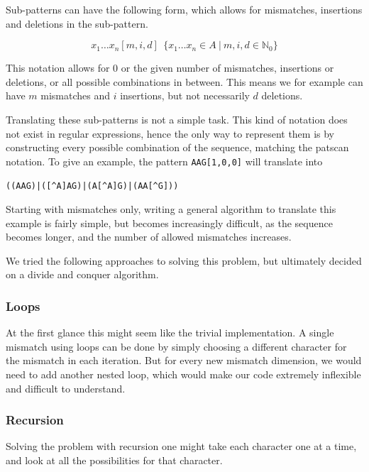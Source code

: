 \documentclass[12pt]{article}
\begin{document}
Sub-patterns can have the following form, which allows for mismatches, insertions and deletions in the sub-pattern. 

\begin{equation}
	x_1 \ldots x_n[m, i, d] \ \ \{ x_1 \ldots x_n \in A \ | \ m, i, d \in \mathbb{N}_0 \}
\end{equation} 

This notation allows for 0 or the given number of mismatches, insertions or deletions, or all possible combinations in between. This means we for example can have $m$ mismatches and $i$ insertions, but not necessarily $d$ deletions.

Translating these sub-patterns is not a simple task. This kind of notation does not exist in regular expressions, hence the only way to represent them is by constructing every possible combination of the sequence, matching the patscan notation. To give an example, the pattern \texttt{AAG[1,0,0]} will translate into 

\hspace*{\fill}
\texttt{((AAG)|([\^{}A]AG)|(A[\^{}A]G)|(AA[\^{}G]))}
\hspace*{\fill}

Starting with mismatches only, writing a general algorithm to translate this example is fairly simple, but becomes increasingly difficult, as the sequence becomes longer, and the number of allowed mismatches increases.

We tried the following approaches to solving this problem, but ultimately decided on a divide and conquer algorithm. 

\subsubsection{Loops}

At the first glance this might seem like the trivial implementation. A single mismatch using loops can be done by simply choosing a different character for the mismatch in each iteration.
But for every new mismatch dimension, we would need to add another nested loop, which would make our code extremely inflexible and difficult to understand.

\subsubsection{Recursion}

Solving the problem with recursion one might take each character one at a time, and look at all the possibilities for that character.
\end{document}
